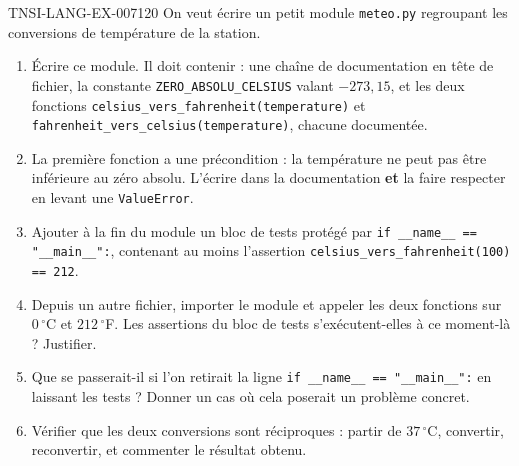 \begin{exercice}{TNSI-LANG-EX-007}{1}{20}
On veut écrire un petit module \lstinline{meteo.py} regroupant les conversions
de température de la station.
\begin{enumerate}
  \item Écrire ce module. Il doit contenir : une chaîne de documentation en tête
    de fichier, la constante \lstinline{ZERO_ABSOLU_CELSIUS} valant
    $-273{,}15$, et les deux fonctions
    \lstinline{celsius_vers_fahrenheit(temperature)} et
    \lstinline{fahrenheit_vers_celsius(temperature)}, chacune documentée.
  \item La première fonction a une précondition : la température ne peut pas être
    inférieure au zéro absolu. L'écrire dans la documentation \textbf{et} la
    faire respecter en levant une \lstinline{ValueError}.
  \item Ajouter à la fin du module un bloc de tests protégé par
    \lstinline{if __name__ == "__main__":}, contenant au moins l'assertion
    \lstinline{celsius_vers_fahrenheit(100) == 212}.
  \item Depuis un autre fichier, importer le module et appeler les deux
    fonctions sur $0\,^\circ$C et $212\,^\circ$F. Les assertions du bloc de tests
    s'exécutent-elles à ce moment-là ? Justifier.
  \item Que se passerait-il si l'on retirait la ligne
    \lstinline{if __name__ == "__main__":} en laissant les tests ? Donner un cas
    où cela poserait un problème concret.
  \item Vérifier que les deux conversions sont réciproques : partir de
    $37\,^\circ$C, convertir, reconvertir, et commenter le résultat obtenu.
\end{enumerate}
\end{exercice}
